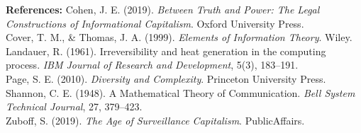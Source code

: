 \documentclass[
]{article}
\begin{document}
\textbf{References:}
Cohen, J. E. (2019). \emph{Between Truth and Power: The Legal Constructions of Informational Capitalism}. Oxford University Press.\\
Cover, T. M., \& Thomas, J. A. (1999). \emph{Elements of Information Theory}. Wiley.\\
Landauer, R. (1961). Irreversibility and heat generation in the computing process. \emph{IBM Journal of Research and Development}, 5(3), 183--191.\\
Page, S. E. (2010). \emph{Diversity and Complexity}. Princeton University Press.\\
Shannon, C. E. (1948). A Mathematical Theory of Communication. \emph{Bell System Technical Journal}, 27, 379--423.\\
Zuboff, S. (2019). \emph{The Age of Surveillance Capitalism}. PublicAffairs.
\end{document}
